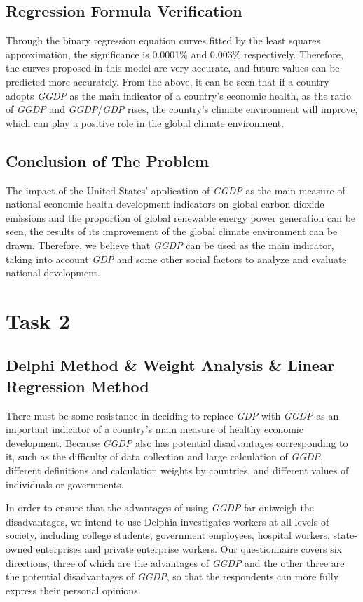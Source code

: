 \documentclass[12pt]{article}
\begin{document}
	\subsection{Regression Formula Verification} %
	Through the binary regression equation curves fitted by the least squares approximation, the significance is 0.0001\% and 0.003\% respectively.
	Therefore, the curves proposed in this model are very accurate, and future values can be predicted more accurately.
	From the above, it can be seen that if a country adopts \textit{GGDP} as the main indicator of a country's economic health, as the ratio of \textit{GGDP} and \textit{GGDP}/\textit{GDP} rises, the country's climate environment will improve, which can play a positive role in the global climate environment.

	\subsection{Conclusion of The Problem} %
	The impact of the United States' application of \textit{GGDP} as the main measure of national economic health development indicators on global carbon dioxide emissions and the proportion of global renewable energy power generation can be seen, the results of its improvement of the global climate environment can be drawn.
	Therefore, we believe that \textit{GGDP} can be used as the main indicator, taking into account \textit{GDP} and some other social factors to analyze and evaluate national development.
		
	\section{Task 2}\label{task2} %
	\subsection*{Delphi Method \& Weight Analysis \& Linear Regression Method} %
	There must be some resistance in deciding to replace \textit{GDP} with \textit{GGDP} as an important indicator of a country's main measure of healthy economic development. 
	Because \textit{GGDP} also has potential disadvantages corresponding to it, such as the difficulty of data collection and large calculation of \textit{GGDP}, different definitions and calculation weights by countries, and different values of individuals or governments.
	
	In order to ensure that the advantages of using \textit{GGDP} far outweigh the disadvantages, we intend to use Delphia investigates workers at all levels of society, including college students, government employees, hospital workers, state-owned enterprises and private enterprise workers.
	Our questionnaire covers six directions, three of which are the advantages of \textit{GGDP} and the other three are the potential disadvantages of \textit{GGDP}, so that the respondents can more fully express their personal opinions.
	
\end{document}
